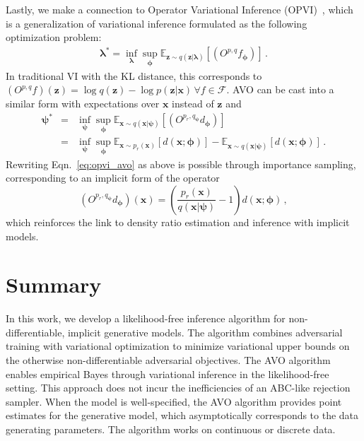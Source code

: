 \documentclass{article}
\newcommand{\bfpsi}{{\bm \psi}}
\newcommand{\bfphi}{{\bm \phi}}
\newcommand{\bflambda}{{\bm \lambda}}
\newcommand{\bfx}{\mathbf{x}}
\newcommand{\bfz}{\mathbf{z}}
\theoremstyle{plain}
\begin{document}
Lastly, we make a connection to Operator Variational Inference (OPVI)~\cite{2016arXiv161009033R},
which is a generalization of variational inference formulated as the following optimization problem:
\begin{eqnarray}
\bflambda^* = \inf_\bflambda \sup_\bfphi \mathbb{E}_{ \bfz \sim q( \bfz | \bflambda)} [ (O^{p,q} f_\bfphi) ] \, .
\end{eqnarray}
In traditional VI with the KL distance, this corresponds to $(O^{p,q} f)(\bfz) = \log q(\bfz) - \log p(\bfz|\bfx) \, \forall f \in \mathcal{F}$.
AVO can be cast into a similar form with expectations over $\bfx$ instead of $\bfz$ and
\begin{eqnarray} \label{eq:opvi_avo}
\bfpsi^* &=& \inf_\bfpsi \sup_\bfphi \mathbb{E}_{ \bfx \sim q( \bfx | \bfpsi)} [ (O^{p_r,q_\bfpsi} d_\bfphi) ] \\
\label{eq:opvi_avo2} &=&  \inf_\bfpsi \sup_\bfphi \mathbb{E}_{\bfx\sim p_r(\bfx)}[d(\bfx; \bfphi)] - \mathbb{E}_{\bfx \sim q(\bfx|\bfpsi)}[d(\bfx; \bfphi)] \nonumber \, .
\end{eqnarray}
Rewriting Eqn.~\ref{eq:opvi_avo} as above is possible through importance sampling,
corresponding to an implicit form of the operator
\begin{equation}
(O^{p_r,q_\bfpsi} d_\bfphi)(\bfx) = \left( \frac{p_r(\bfx)}{q(\bfx|\bfpsi)}  -1 \right) d(\bfx; \bfphi) \, ,
\end{equation}
which reinforces the link to density ratio estimation and inference with implicit models.



\section{Summary}

In this work, we develop a likelihood-free inference algorithm for
non-differentiable, implicit generative models. The algorithm combines
adversarial training  with variational optimization to minimize variational
upper bounds  on the otherwise non-differentiable adversarial objectives. The
AVO algorithm enables empirical Bayes through variational inference in the
likelihood-free setting. This approach does not incur the inefficiencies of an
ABC-like rejection sampler. When the model is well-specified, the AVO algorithm
provides point estimates for
the generative model, which asymptotically corresponds to the data generating
parameters. The algorithm works on continuous or discrete data.
\end{document}
